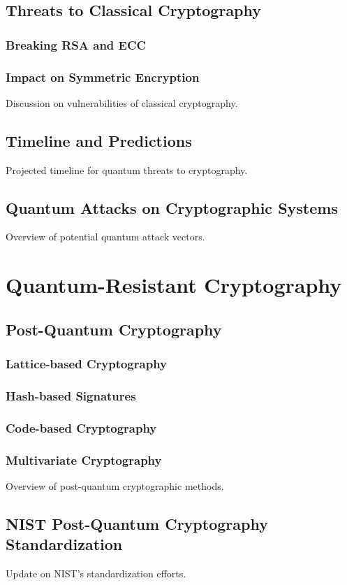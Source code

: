 \documentclass{report}
\begin{document}
\section{Threats to Classical Cryptography}
\subsection{Breaking RSA and ECC}
\subsection{Impact on Symmetric Encryption}
Discussion on vulnerabilities of classical cryptography.
\section{Timeline and Predictions}
Projected timeline for quantum threats to cryptography.
\section{Quantum Attacks on Cryptographic Systems}
Overview of potential quantum attack vectors.


\chapter{Quantum-Resistant Cryptography}
\section{Post-Quantum Cryptography}
\subsection{Lattice-based Cryptography}
\subsection{Hash-based Signatures}
\subsection{Code-based Cryptography}
\subsection{Multivariate Cryptography}
Overview of post-quantum cryptographic methods.


\section{NIST Post-Quantum Cryptography Standardization}
Update on NIST's standardization efforts.
\end{document}
